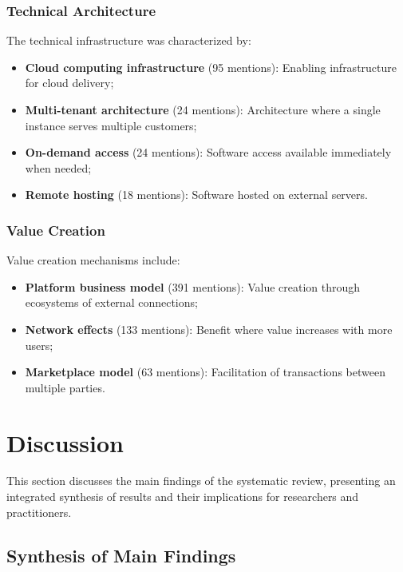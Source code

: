 \documentclass[journal]{IEEEtran}
\begin{document}
\subsubsection{Technical Architecture}

The technical infrastructure was characterized by:
\begin{itemize}
    \item \textbf{Cloud computing infrastructure} (95 mentions): Enabling infrastructure for cloud delivery;
    \item \textbf{Multi-tenant architecture} (24 mentions): Architecture where a single instance serves multiple customers;
    \item \textbf{On-demand access} (24 mentions): Software access available immediately when needed;
    \item \textbf{Remote hosting} (18 mentions): Software hosted on external servers.
\end{itemize}

\subsubsection{Value Creation}

Value creation mechanisms include:
\begin{itemize}
    \item \textbf{Platform business model} (391 mentions): Value creation through ecosystems of external connections;
    \item \textbf{Network effects} (133 mentions): Benefit where value increases with more users;
    \item \textbf{Marketplace model} (63 mentions): Facilitation of transactions between multiple parties.
\end{itemize}





\section{Discussion}\label{sec:discussion}

This section discusses the main findings of the systematic review, presenting an integrated synthesis of results and their implications for researchers and practitioners.

\subsection{Synthesis of Main Findings}
\end{document}
